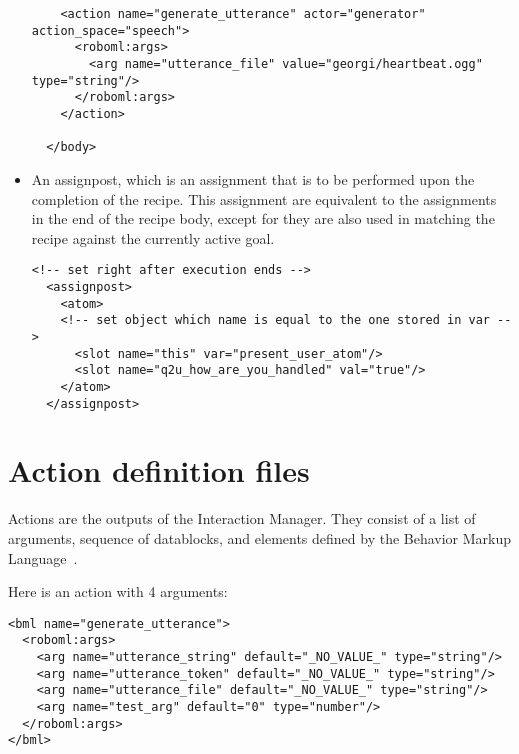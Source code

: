 \begin{itemize}
\begin{lstlisting}
    <action name="generate_utterance" actor="generator" action_space="speech">
      <roboml:args>
        <arg name="utterance_file" value="georgi/heartbeat.ogg" type="string"/>
      </roboml:args>
    </action>
    
  </body>
\end{lstlisting}

\item An assignpost, which is an assignment that is to be performed upon the completion of the recipe. This assignment are equivalent to the assignments in the end of the recipe body, except for they are also used in matching the recipe against the currently active goal. 

\lstset{language=XML}
\begin{lstlisting}
<!-- set right after execution ends -->
  <assignpost>
    <atom>
    <!-- set object which name is equal to the one stored in var -->
      <slot name="this" var="present_user_atom"/>
      <slot name="q2u_how_are_you_handled" val="true"/>
    </atom>
  </assignpost>
\end{lstlisting}


\end{itemize}

\section{Action definition files}

Actions are the outputs of the Interaction Manager. They consist of a list of arguments, sequence of datablocks, and elements defined by the Behavior Markup Language~\citep{BMLweb}.


Here is an action with 4 arguments:

\lstset{language=XML}
\begin{lstlisting}
<bml name="generate_utterance">
  <roboml:args>
    <arg name="utterance_string" default="_NO_VALUE_" type="string"/>
    <arg name="utterance_token" default="_NO_VALUE_" type="string"/>
    <arg name="utterance_file" default="_NO_VALUE_" type="string"/>
    <arg name="test_arg" default="0" type="number"/>
  </roboml:args>
</bml>
\end{lstlisting}
